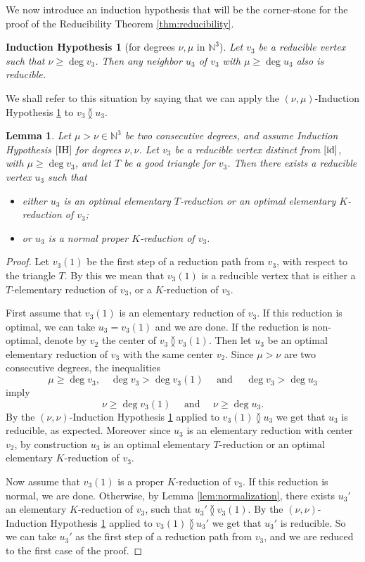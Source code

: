 \documentclass[reqno,oneside,11pt]{amsart}
\theoremstyle{plain}
\newtheorem{lemma}[theorem]{Lemma}
\newtheorem{IH}[theorem]{Induction Hypothesis}
\theoremstyle{definition}
\newcommand{\N}{\mathbb{N}}
\newcommand{\id}{\text{\rm id}}
\renewcommand{\ne}{\between}
\renewcommand{\ge}{\geqslant}
\begin{document}
We now introduce an induction hypothesis that will be the corner-stone for the proof of the Reducibility Theorem \ref{thm:reducibility}.

\begin{IH}[for degrees $\nu, \mu$ in $\N^3$] \label{IH}
Let $v_3$ be a reducible vertex such that $\nu \ge \deg v_3$.
Then any neighbor $u_3$ of $v_3$ with $\mu \ge \deg u_3$ also is reducible.
\end{IH}

We shall refer to this situation by saying that we can apply the $(\nu, \mu)$-Induction Hypothesis \ref{IH} to $v_3 \ne u_3$.



\begin{lemma} \label{lem:optimal normal}
Let $\mu > \nu \in \N^3$ be two consecutive degrees, and assume Induction Hypothesis $\ref{IH}$ for degrees $\nu, \nu$.
Let $v_3$ be a reducible vertex distinct from $[\id]$, with $\mu \ge \deg v_3$,
and let $T$ be a good triangle for $v_3$.
Then there exists a reducible vertex $u_3$ such that
\begin{itemize}
\item either $u_3$ is an optimal elementary $T$-reduction or an optimal
elementary $K$-reduction of $v_3$;
\item or $u_3$ is a normal proper $K$-reduction of $v_3$.
\end{itemize}
\end{lemma}

\begin{proof}
Let $v_3(1)$ be the first step of a reduction path from $v_3$, with respect to
the triangle $T$.
By this we mean that $v_3(1)$ is a reducible vertex that is either a
$T$-elementary reduction of $v_3$, or a $K$-reduction of $v_3$.

First assume that $v_3(1)$ is an elementary reduction of $v_3$.
If this reduction is optimal, we can take $u_3 = v_3(1)$ and we are done.
If the reduction is non-optimal, denote by $v_2$ the center of $v_3 \ne
v_3(1)$.
Then let $u_3$ be an optimal elementary reduction of $v_3$ with the same center
$v_2$.
Since $\mu > \nu $ are two consecutive degrees, the inequalities
$$\mu \ge \deg v_3, \quad \deg v_3 > \deg v_3(1) \quad \text{ and } \quad
\deg v_3 > \deg u_3$$
imply
$$\nu \ge \deg v_3(1)  \quad  \text{ and } \quad \nu \ge \deg u_3.$$
By the $(\nu,\nu)$-Induction Hypothesis \ref{IH} applied to $v_3(1) \ne u_3$
we get that $u_3$ is reducible, as expected.
Moreover since $u_3$ is an elementary reduction with center $v_2$, by
construction $u_3$ is an optimal elementary $T$-reduction or an optimal
elementary $K$-reduction of $v_3$.

Now assume that $v_3(1)$ is a proper $K$-reduction of $v_3$.
If this reduction is normal, we are done.
Otherwise, by Lemma \ref{lem:normalization}, there exists $u_3'$ an elementary
$K$-reduction of $v_3$, such that $u_3' \ne v_3(1)$.
By the $(\nu, \nu)$-Induction Hypothesis \ref{IH} applied to $v_3(1) \ne u_3'$
we get that $u_3'$ is reducible.
So we can take $u_3'$ as the first step of a reduction path from $v_3$,
and we are reduced to the first case of the proof.
\end{proof}
\end{document}
